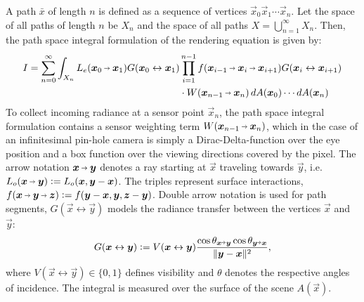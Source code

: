A path $\bar{x}$ of length $n$ is defined as a sequence of vertices $\vec{x}_0 \vec{x}_1 \cdots \vec{x}_n$.
Let the space of all paths of length $n$ be $X_n$ and the space of all paths $X = \bigcup_{n=1}^{\infty} X_n$.
Then, the path space integral formulation of the rendering equation is given by:
\begin{equation}
\label{eq:path_space_integral}
\begin{aligned}
    I
    = \sum_{n=0}^{\infty} \int_{X_n} L_e(\pdir{0}{1}) \G{0}{1} &\prod_{i=1}^{n - 1} \f{i-1}{i}{i+1} \G{i}{i+1}\\
    &\cdot W(\pdir{n-1}{n}) \diff A(\vec{x}_0) \cdots \diff A(\vec{x}_n)
\end{aligned}
\end{equation}
To collect incoming radiance at a sensor point $\vec{x}_n$, the path space integral formulation contains a sensor weighting term $W(\pdir{n-1}{n})$, which in the case of an infinitesimal pin-hole camera is simply a Dirac-Delta-function over the eye position and a box function over the viewing directions covered by the pixel.
The arrow notation $\vec{x} \pto \vec{y}$ denotes a ray starting at $\vec{x}$ traveling towards $\vec{y}$, i.e. $L_o(\vec{x} \pto \vec{y}) \defeq L_o(\vec{x}, \vec{y} - \vec{x})$.
The triples represent surface interactions, $f(\vec{x} \pto \vec{y} \pto \vec{z}) \defeq f(\vec{y} - \vec{x}, \vec{y}, \vec{z} - \vec{y})$. 
Double arrow notation is used for path segments, $G(\vec{x} \leftrightarrow \vec{y})$ models the radiance transfer between the vertices $\vec{x}$ and $\vec{y}$:
\begin{equation}
    \label{eq:transfer}
    G(\vec{x} \leftrightarrow \vec{y}) \defeq V(\vec{x} \leftrightarrow \vec{y}) \frac{\cos \theta_{\vec{x} \veryshortarrow \vec{y}} \cos \theta_{\vec{y} \veryshortarrow \vec{x}}}{\|\vec{y} - \vec{x}\|^2},
\end{equation}
where $V(\vec{x} \leftrightarrow \vec{y}) \in \{0,1\}$ defines visibility and $\theta$ denotes the respective angles of incidence.
The integral is measured over the surface of the scene $A(\vec{x})$.

